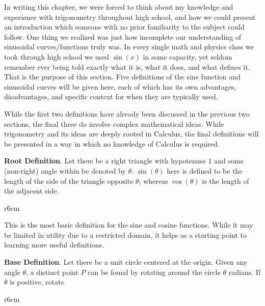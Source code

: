\documentclass[lang=en,11pt]{elegantbook}
\begin{document}
In writing this chapter, we were forced to think about my knowledge and experience with trigonometry throughout high school, and how we could present an introduction which someone with no prior familiarity to the subject could follow. One thing we realized was just how incomplete our understanding of sinusoidal curves/functions truly was. In every single math and physics class we took through high school we used $\sin⁡(x)$ in some capacity, yet seldom remember ever being told exactly what it is, what it does, and what defines it. That is the purpose of this section. Five definitions of the sine function and sinusoidal curves will be given here, each of which has its own advantages, disadvantages, and specific context for when they are typically used.

\begin{remark}
While the first two definitions have already been discussed in the previous two sections, the final three do involve complex mathematical ideas. While trigonometry and its ideas are deeply rooted in Calculus, the final definitions will be presented in a way in which no knowledge of Calculus is required.
\end{remark}

\textbf{Root Definition}. Let there be a right triangle with hypotenuse $1$ and some (non-right) angle within be denoted by $\theta$. $\sin(\theta)$ here is defined to be the length of the side of the triangle opposite $\theta$; whereas $\cos(\theta)$ is the length of the adjacent side.

\begin{wrapfigure}{r}{6cm}
\end{wrapfigure}

This is the most basic definition for the sine and cosine functions. While it may be limited in utility due to a restricted domain, it helps as a starting point to learning more useful definitions.

\textbf{Base Definition}. Let there be a unit circle centered at the origin.  Given any angle $\theta$, a distinct point $P$ can be found by rotating around the circle $\theta$ radians.  If $\theta$ is positive, rotate

\begin{wrapfigure}{r}{6cm}
\end{wrapfigure}
\end{document}
